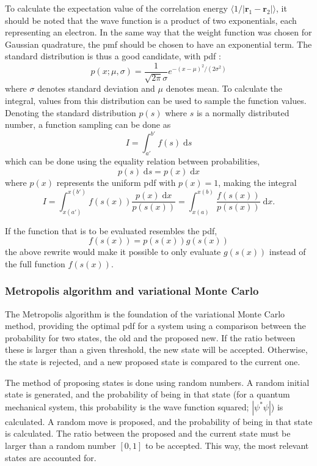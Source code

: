 \documentclass[a4paper,11pt]{article}
\newcommand{\diff}{\ensuremath{\; \text{d}}}
\begin{document}
To calculate the expectation value of the correlation energy $\langle 1/|\mathbf{r}_1 - \mathbf{r}_2| \rangle$, it should be noted that the wave function is a product of two exponentials, each representing an electron. In the same way that the weight function was chosen for Gaussian quadrature, the pmf should be chosen to have an exponential term. The standard distribution is thus a good candidate, with pdf \cite{Devore:2007}:
\begin{equation}
    p(x; \mu, \sigma) = \frac{1}{\sqrt{2\pi} \sigma} e^{-\left( x-\mu \right)^2/\left( 2\sigma^2 \right)}
    \label{eq:standarddist}
\end{equation}
where $\sigma$ denotes standard deviation and $\mu$ denotes mean. To calculate the integral, values from this distribution can be used to sample the function values. Denoting the standard distribution $p(s)$ where $s$ is a normally distributed number, a function sampling can be done as
\[ I = \int_{a'}^{b'} f(s) \diff s \]
which can be done using the equality relation between probabilities,
\[ p(s) \diff s = p(x) \diff x \]
where $p(x)$ represents the uniform pdf with $p(x) = 1$, making the integral
\[ I = \int_{x(a')}^{x(b')} f(s(x)) \frac{p(x) \diff x}{p(s(x))} = \int_{x(a)}^{x(b)} \frac{f(s(x))}{p(s(x))} \diff x. \]

If the function that is to be evaluated resembles the pdf, 
\[ f(s(x)) = p(s(x)) g(s(x)) \]
the above rewrite would make it possible to only evaluate $g(s(x))$ instead of the full function $f(s(x))$.

\subsubsection{Metropolis algorithm and variational Monte Carlo}
    The Metropolis algorithm is the foundation of the variational Monte Carlo method, providing the optimal pdf for a system using a comparison between the probability for two states, the old and the proposed new. If the ratio between these is larger than a given threshold, the new state will be accepted. Otherwise, the state is rejected, and a new proposed state is compared to the current one.

    The method of proposing states is done using random numbers. A random initial state is generated, and the probability of being in that state (for a quantum mechanical system, this probability is the wave function squared; $|\psi^* \psi|$) is calculated. A random move is proposed, and the probability of being in that state is calculated. The ratio between the proposed and the current state must be larger than a random number $[0,1]$ to be accepted. This way, the most relevant states are accounted for. 
\end{document}
